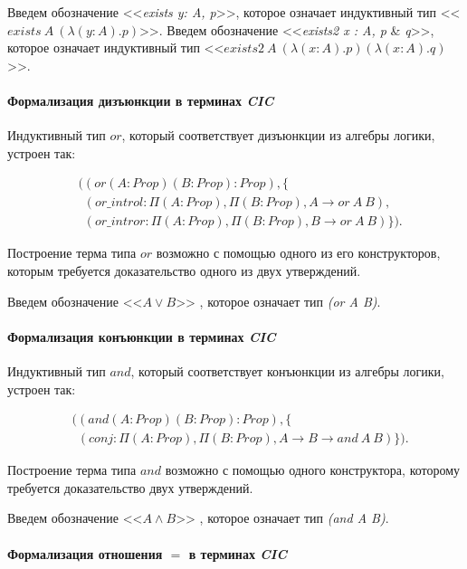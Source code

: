 \documentclass[12pt]{article}
\begin{document}
Введем обозначение <<\textit{exists y: A, p}>>, которое означает индуктивный тип <<$exists\ A\ (\lambda (y:A).p)$>>. Введем обозначение  <<\textit{exists2 x : A, p} \& \textit{q}>>, которое означает индуктивный тип
<<$exists2\ A\ (\lambda (x:A). p) (\lambda (x:A). q)$>>.

\paragraph{Формализация дизъюнкции в терминах \textit{CIC}}\mbox{}

Индуктивный тип $or$, который соответствует дизъюнкции из алгебры логики, устроен так:

\begin{align*}
& ((or(A:Prop)(B:Prop):Prop), \{ \\ 
& \ \ (or\_introl : \Pi(A:Prop), \Pi (B:Prop), A \xrightarrow{} or\ A\ B ), \\
& \ \ (or\_intror : \Pi(A:Prop), \Pi (B:Prop), B \xrightarrow{} or\ A\ B ) \}).
\end{align*}

Построение терма типа $or$ возможно с помощью одного из его конструкторов, которым требуется доказательство одного из двух утверждений.

Введем обозначение  <<$A \lor B$>> , которое означает тип 
\textit{(or A B)}.

\paragraph{Формализация конъюнкции в терминах \textit{CIC}}\mbox{}

Индуктивный тип $and$, который соответствует конъюнкции из алгебры логики, устроен так:

\begin{align*}
& ((and(A:Prop)(B:Prop):Prop), \{ \\ 
& \ \ (conj : \Pi(A:Prop), \Pi (B:Prop), A \xrightarrow{} B \xrightarrow{} and\ A\ B ) \}).
\end{align*}

Построение терма типа $and$ возможно с помощью одного конструктора, которому требуется доказательство двух утверждений.

Введем обозначение  <<$A \wedge B$>> , которое означает тип 
\textit{(and A B)}.

\paragraph{Формализация отношения $=$ в терминах \textit{CIC}}\mbox{}
\end{document}
